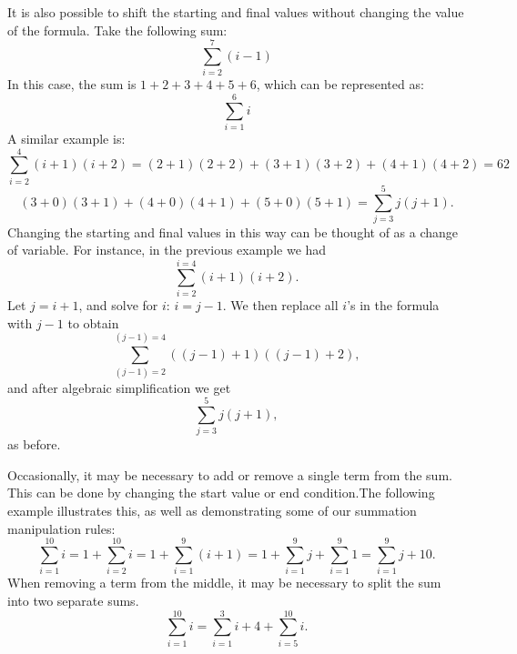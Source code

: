 It is also possible to shift 
the starting and final values without changing the value of the formula. Take the following sum:
\[\sum_{i=2}^{7}(i-1)\] 
In this case, the sum is
$1+2+3+4+5+6$, which can be represented as:
\[\sum_{i=1}^{6}i\] 
A similar example is:
\[\sum_{i=2}^{4}(i+1)(i+2)=(2+1)(2+2) + (3+1)(3+2)+(4+1)(4+2) = 62\]
 \[(3+0)(3+1) + (4+0)(4+1)+(5+0)(5+1) = \sum_{j=3}^{5}j(j+1).\] 
Changing the starting and final values in this way can be thought of as a change of variable. For instance, in the previous example we had
\[\sum_{i=2}^{i=4}(i+1)(i+2).\]
Let $j = i+1$, and solve for $i$: $i = j-1$. We then replace all $i$'s in the formula with $j-1$ to obtain
\[\sum_{(j-1)=2}^{(j-1)=4}((j-1)+1)((j-1)+2),\]
and after algebraic simplification we get
\[\sum_{j=3}^{5}j(j+1),\]
as before.

Occasionally, it may be necessary to add or remove a single term from the sum.  This can be done by changing the start value or end condition.The following example illustrates this, as well as demonstrating some of our summation manipulation rules:
\[\sum_{i=1}^{10}i = 1 + \sum_{i=2}^{10} i = 1+ \sum_{i=1}^9 ( i+1) = 1 +  \sum_{i=1}^9  j +  \sum_{i=1}^9  1 =  \sum_{i=1}^9  j + 10.\]
When removing a term from the middle, it may be necessary to split the sum into two separate sums.
\[\sum_{i=1}^{10}i = \sum_{i=1}^{3}i + 4 + \sum_{i=5}^{10}i.\]

